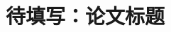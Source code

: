 %

\title{待填写：论文标题}

\newcommand{\PaperKeywords}{数学建模\quad 运筹优化\quad 数据分析\quad 可复现验证}

\newcommand{\PaperOfficialYear}{2025}
\newcommand{\PaperOfficialFrozen}{false}
